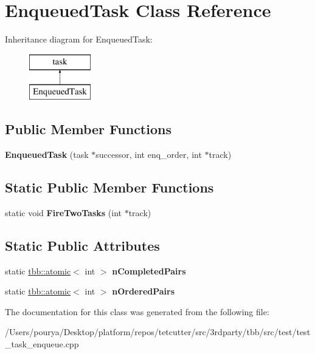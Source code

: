 \hypertarget{classEnqueuedTask}{}\section{Enqueued\+Task Class Reference}
\label{classEnqueuedTask}
Inheritance diagram for Enqueued\+Task\+:\begin{figure}[H]
\begin{center}
\leavevmode
\includegraphics[height=2.000000cm]{classEnqueuedTask}
\end{center}
\end{figure}
\subsection*{Public Member Functions}
\begin{DoxyCompactItemize}
\item 
\hypertarget{classEnqueuedTask_ab62b69ac81d7540634ee4ab97aa16855}{}{\bfseries Enqueued\+Task} (task $\ast$successor, int enq\+\_\+order, int $\ast$track)\label{classEnqueuedTask_ab62b69ac81d7540634ee4ab97aa16855}

\end{DoxyCompactItemize}
\subsection*{Static Public Member Functions}
\begin{DoxyCompactItemize}
\item 
\hypertarget{classEnqueuedTask_a14a452e405d6737d32aa3a20ebf9e9f6}{}static void {\bfseries Fire\+Two\+Tasks} (int $\ast$track)\label{classEnqueuedTask_a14a452e405d6737d32aa3a20ebf9e9f6}

\end{DoxyCompactItemize}
\subsection*{Static Public Attributes}
\begin{DoxyCompactItemize}
\item 
\hypertarget{classEnqueuedTask_a074413bfbf3d9bfb47b0faffefa9ca15}{}static \hyperlink{structtbb_1_1atomic}{tbb\+::atomic}$<$ int $>$ {\bfseries n\+Completed\+Pairs}\label{classEnqueuedTask_a074413bfbf3d9bfb47b0faffefa9ca15}

\item 
\hypertarget{classEnqueuedTask_a8f342ed98c97dd7705a40486baec5b9b}{}static \hyperlink{structtbb_1_1atomic}{tbb\+::atomic}$<$ int $>$ {\bfseries n\+Ordered\+Pairs}\label{classEnqueuedTask_a8f342ed98c97dd7705a40486baec5b9b}

\end{DoxyCompactItemize}


The documentation for this class was generated from the following file\+:\begin{DoxyCompactItemize}
\item 
/\+Users/pourya/\+Desktop/platform/repos/tetcutter/src/3rdparty/tbb/src/test/test\+\_\+task\+\_\+enqueue.\+cpp\end{DoxyCompactItemize}

